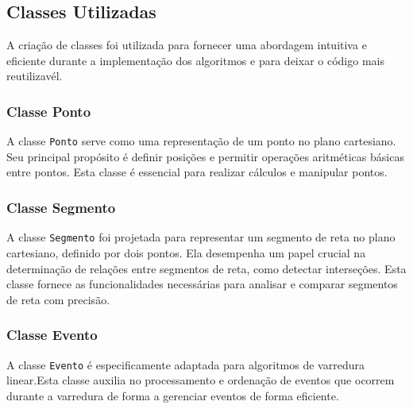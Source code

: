 \documentclass[11pt]{article}
\begin{document}
    \hypertarget{classes-utilizadas}{%
\subsection{Classes Utilizadas}\label{classes-utilizadas}}

A criação de classes foi utilizada para fornecer uma abordagem intuitiva
e eficiente durante a implementação dos algoritmos e para deixar o
código mais reutilizavél.

\hypertarget{classe-ponto}{%
\subsubsection{Classe Ponto}\label{classe-ponto}}

A classe \texttt{Ponto} serve como uma representação de um ponto no
plano cartesiano. Seu principal propósito é definir posições e permitir
operações aritméticas básicas entre pontos. Esta classe é essencial para
realizar cálculos e manipular pontos.

\hypertarget{classe-segmento}{%
\subsubsection{Classe Segmento}\label{classe-segmento}}

A classe \texttt{Segmento} foi projetada para representar um segmento de
reta no plano cartesiano, definido por dois pontos. Ela desempenha um
papel crucial na determinação de relações entre segmentos de reta, como
detectar interseções. Esta classe fornece as funcionalidades necessárias
para analisar e comparar segmentos de reta com precisão.

\hypertarget{classe-evento}{%
\subsubsection{Classe Evento}\label{classe-evento}}

A classe \texttt{Evento} é especificamente adaptada para algoritmos de
varredura linear.Esta classe auxilia no processamento e ordenação de
eventos que ocorrem durante a varredura de forma a gerenciar eventos de
forma eficiente.
\end{document}
